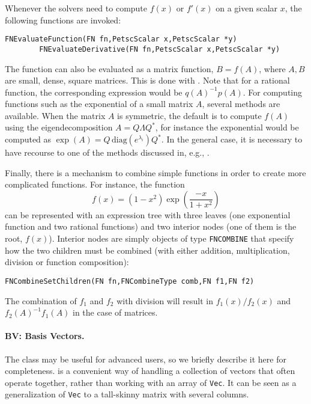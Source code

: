 Whenever the solvers need to compute $f(x)$ or $f'(x)$ on a given scalar $x$, the following functions are invoked:
        \begin{Verbatim}[fontsize=\small]
        FNEvaluateFunction(FN fn,PetscScalar x,PetscScalar *y)
        FNEvaluateDerivative(FN fn,PetscScalar x,PetscScalar *y)
        \end{Verbatim}
The function can also be evaluated as a matrix function, $B=f(A)$, where $A,B$ are small, dense, square matrices. This is done with . Note that for a rational function, the corresponding expression would be $q(A)^{-1}p(A)$.
For computing functions such as the exponential of a small matrix $A$, several methods are available. When the matrix $A$ is symmetric, the default is to compute $f(A)$ using the eigendecomposition $A=Q\Lambda Q^*$, for instance the exponential would be computed as $\exp(A)=Q\,\mathrm{diag}(e^{\lambda_i})Q^*$. In the general case, it is necessary to have recourse to one of the methods discussed in, e.g., \citep{Higham:2010:CMF}.

Finally, there is a mechanism to combine simple functions in order to create more complicated functions. For instance, the function
\begin{equation}
f(x) = (1-x^2) \exp\left( \frac{-x}{1+x^2} \right)
\end{equation}
can be represented with an expression tree with three leaves (one exponential function and two rational functions) and two interior nodes (one of them is the root, $f(x)$). Interior nodes are simply  objects of type \texttt{FNCOMBINE} that specify how the two children must be combined (with either addition, multiplication, division or function composition):
        \begin{Verbatim}[fontsize=\small]
        FNCombineSetChildren(FN fn,FNCombineType comb,FN f1,FN f2)
        \end{Verbatim}
The combination of $f_1$ and $f_2$ with division will result in $f_1(x)/f_2(x)$ and $f_2(A)^{-1}f_1(A)$ in the case of matrices.

\paragraph{BV: Basis Vectors.}

The  class may be useful for advanced users, so we briefly describe it here for completeness.  is a convenient way of handling a collection of vectors that often operate together, rather than working with an array of \texttt{Vec}. It can be seen as a generalization of \texttt{Vec} to a tall-skinny matrix with several columns.

